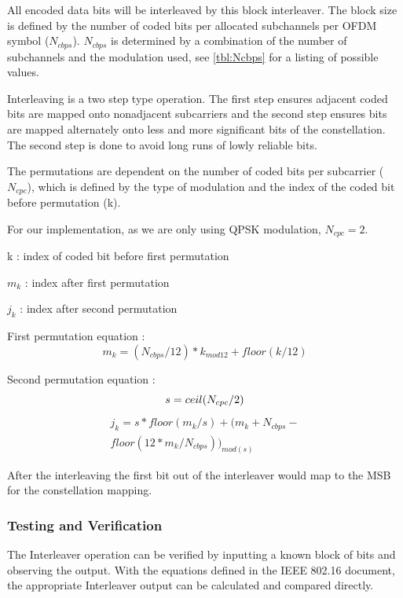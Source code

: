 \documentclass[dvips,10pt,twocolumn]{article}
\begin{document}
All encoded data bits will be interleaved by this block interleaver. The
block size is defined by the number of coded bits per allocated subchannels 
per OFDM symbol ($N_{cbps}$). $N_{cbps}$ is determined by a
combination of the number of subchannels and the modulation used, see
\autoref{tbl:Ncbps} for a listing of possible values.

Interleaving is a two step type operation. The first step ensures adjacent 
coded bits are mapped onto nonadjacent subcarriers and the second step 
ensures bits are mapped alternately onto less and more significant bits of
the constellation. The second step is done to avoid long runs of lowly
reliable bits.
 
The permutations are dependent on the number of coded bits per subcarrier
($N_{cpc}$), which is defined by the type of modulation and the index of the
coded bit before permutation (k).

For our implementation, as we are only using QPSK modulation,
$N_{cpc} = 2$.

k : index of coded bit before first permutation

$m_{k}$ : index after first permutation

$j_{k}$ : index after second permutation 

First permutation equation :
\begin{equation}
m_k = (N_{cbps}/12)*k_{mod12}+floor(k/12)
\end{equation}

Second permutation equation :
\begin{equation}
s=ceil(N_{cpc}/2) \\
\end{equation}
\begin{eqnarray}
j_k = s*floor(m_{k}/s)+(m_{k}+N_{cbps}- \nonumber \\
	floor(12*m_k/N_{cbps}))_{mod(s)}
\end{eqnarray}

After the interleaving the first bit out of the interleaver would map to the
MSB for the constellation mapping. 

	\subsubsection{Testing and Verification}
	The Interleaver operation can be verified by inputting a known block
	of bits and observing the output. With the equations defined in the
	IEEE 802.16 document, the appropriate Interleaver output can be
	calculated and compared directly. 
  
\end{document}
